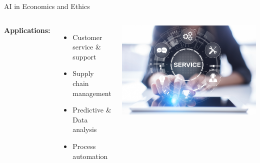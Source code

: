 \documentclass{beamer}
\begin{document}
\begin{frame}{AI in Economics and Ethics}
  \begin{columns}
      \textbf{Applications:}
      \begin{itemize}
        \item Customer service \& support
        \item Supply chain management
        \item Predictive \& Data analysis
        \item Process automation
      \end{itemize}
    \centering
    \includegraphics[width=\textwidth]{Customer-Support.png}
  \end{columns}
\end{frame}
\end{document}
